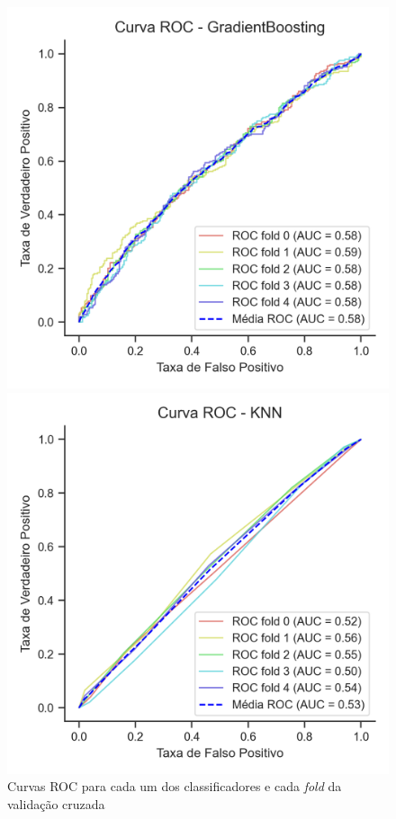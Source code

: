 \begin{figure}[htb]
	\centering
	\caption{\label{img:curvasRocSemTunagem}Curvas ROC para cada um dos classificadores e cada \textit{fold} da validação cruzada}
	
	\begin{minipage}[t]{0.28\textwidth}
		\centering
		\includegraphics[width=\textwidth]{USPSC-img/Curva ROC - GradientBoosting.png}
	\end{minipage}
	\hfill
	\begin{minipage}[t]{0.28\textwidth}
		\centering
		\includegraphics[width=\textwidth]{USPSC-img/Curva ROC - KNN.png}

\end{minipage}
\end{figure}
